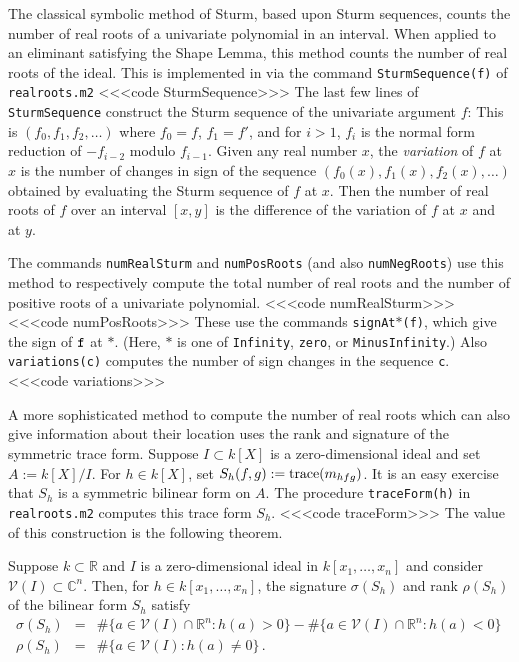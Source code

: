 The classical symbolic method of Sturm, based upon Sturm sequences,  counts
the number of  real roots of a univariate polynomial in an interval.
When applied to an eliminant satisfying the Shape Lemma, this method counts
the number of real roots of the ideal.
This is implemented in \Mtwo{}\/ via the command
{\tt SturmSequence(f)} of {\tt realroots.m2}
%
<<<code SturmSequence>>>
%
The last few lines of {\tt SturmSequence} construct the Sturm
sequence of the univariate argument $f$:
This is $(f_0, f_1, f_2,\ldots)$ where $f_0=f$, $f_1=f'$, and 
for $i>1$, $f_i$ is the normal form reduction of $-f_{i-2}$ modulo
$f_{i-1}$.
Given any real number $x$, the {\it variation} of $f$ at $x$ is the number of
changes in sign of the sequence $(f_0(x), f_1(x), f_2(x),\ldots)$ obtained by
evaluating the Sturm sequence of $f$ at $x$.
Then the number of real roots of $f$ over an interval $[x,y]$ is the
difference of the variation of $f$ at $x$ and at $y$.

The \Mtwo{}\/ commands  {\tt numRealSturm} and 
{\tt numPosRoots} (and also {\tt numNegRoots}) use this method to respectively
compute the total number of real roots and the number of positive roots of 
a univariate polynomial. 
%
<<<code numRealSturm>>>
%
<<<code numPosRoots>>>
%
These use the commands {\tt signAt}$*${\tt (f)}, which 
give the sign of ${\tt f}$
at $*$.
(Here, $*$ is one of  {\tt Infinity}, {\tt zero}, or {\tt MinusInfinity}.)
Also {\tt variations(c)} computes the 
number of sign changes in the sequence {\tt c}.
%
<<<code variations>>>
%


A more sophisticated method to compute the number of real roots which can also
give information about their location uses the rank and
signature of the
symmetric trace form. 
Suppose $I\subset k[X]$ is a zero-dimensional ideal and 
set $A:=k[X]/I$.
For $h\in k[X]$, set $S_h(f,g):={\rm trace}(m_{hfg})$.
It is an easy exercise that $S_h$ is a symmetric bilinear form on $A$.
The procedure {\tt traceForm(h)} in {\tt realroots.m2}
computes this trace form $S_h$.
%
<<<code traceForm>>>
%
The value of this construction is the following theorem.

\begin{theorem}\label{t:PRS}
Suppose $k\subset{\mathbb R}$ and $I$ is a zero-dimensional ideal in
$k[x_1,\ldots,x_n]$ and consider ${\mathcal V}(I)\subset {\mathbb C}^n$. 
Then, for $h\in k[x_1,\ldots,x_n]$, the signature $\sigma(S_h)$ and rank 
$\rho(S_h)$ of the bilinear form $S_h$ satisfy
\begin{eqnarray*}
\sigma(S_h)&=&\#\{a\in{\mathcal V}(I)\cap{\mathbb R}^n:h(a)>0\}
            - \#\{a\in{\mathcal V}(I)\cap{\mathbb R}^n:h(a)<0\}\,\\
\rho(S_h)&=&\#\{a\in{\mathcal V}(I):h(a)\neq0\}\,.
\end{eqnarray*}
\end{theorem}

